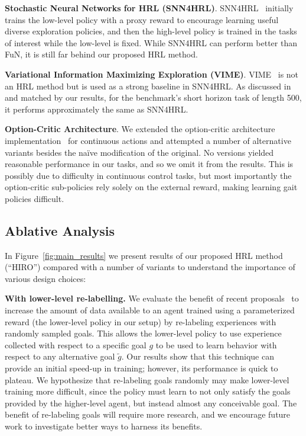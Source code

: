 \documentclass{article}
\begin{document}
\textbf{Stochastic Neural Networks for HRL (SNN4HRL)}. SNN4HRL~\cite{florensa2017stochastic}
initially trains the low-level policy with a proxy reward to encourage learning useful diverse exploration policies, and then the high-level policy is trained in the tasks of interest while the low-level is fixed.  While SNN4HRL can perform better than FuN, it is still far behind our proposed HRL method.

\textbf{Variational Information Maximizing Exploration (VIME)}. VIME~\cite{houthooft2016vime} is not an HRL method but is used as a strong baseline in SNN4HRL. As discussed in~\cite{florensa2017stochastic} and matched by our results, for the benchmark's short horizon task of length 500, it performs approximately the same as SNN4HRL.

\textbf{Option-Critic Architecture}. We extended the option-critic architecture implementation~\cite{bacon2017option} for continuous actions and attempted a number of alternative variants besides the na\"{i}ve modification of the original. No versions yielded reasonable performance in our tasks, and so we omit it from the results. This is possibly due to difficulty in continuous control tasks, but most importantly the option-critic sub-policies rely solely on the external reward, making learning gait policies difficult.

\subsection{Ablative Analysis}
\label{sec:results}

In Figure~\ref{fig:main_results} we present results of our proposed HRL method (``HIRO'') compared with a number of variants to understand the importance of various design choices:

\textbf{With lower-level re-labelling.}  We evaluate the benefit of recent proposals~\cite{andrychowicz2017hindsight,tdm} to increase the amount of data available to an agent trained using a parameterized reward (the lower-level policy in our setup) by re-labeling experiences with randomly sampled goals.  This allows the lower-level policy to use experience collected with respect to a specific goal $g$ to be used to learn behavior with respect to any alternative goal $\tilde{g}$.  Our results show that this technique can provide an initial speed-up in training; however, its performance is quick to plateau. We hypothesize that re-labeling goals randomly may make lower-level training more difficult, since the policy must learn to not only satisfy the goals provided by the higher-level agent, but instead almost any conceivable goal. The benefit of re-labeling goals will require more research, and we encourage future work to investigate better ways to harness its benefits.
\end{document}
